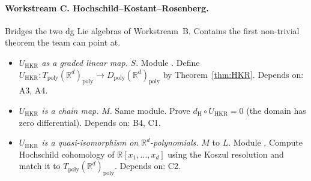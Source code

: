 \documentclass[11pt,a4paper]{article}
\theoremstyle{definition}
\newcommand{\R}{\mathbb{R}}
\newcommand{\Tpoly}{T_{\mathrm{poly}}}
\newcommand{\Dpoly}{D_{\mathrm{poly}}}
\newcommand{\defi}[1]{\emph{#1}}
\begin{document}
\paragraph{Workstream C. Hochschild--Kostant--Rosenberg.}
Bridges the two dg Lie algebras of Workstream~B. Contains the first
non-trivial theorem the team can point at.
\begin{itemize}[leftmargin=2em]
  \item[\textbf{C1}]
    \defi{$U_{\mathrm{HKR}}$ as a graded linear map.} $S$. Module
    . Define
    $U_{\mathrm{HKR}} \colon \Tpoly(\R^{d})_{\mathrm{poly}}
    \to \Dpoly(\R^{d})_{\mathrm{poly}}$ by
    Theorem~\ref{thm:HKR}. Depends on: A3, A4.
  \item[\textbf{C2}]
    \defi{$U_{\mathrm{HKR}}$ is a chain map.} $M$. Same module.
    Prove $d_{\mathrm{H}} \circ U_{\mathrm{HKR}} = 0$ (the domain has
    zero differential). Depends on: B4, C1.
  \item[\textbf{C3}]
    \defi{$U_{\mathrm{HKR}}$ is a quasi-isomorphism on
          $\R^{d}$-polynomials.} $M$ to $L$. Module
    . Compute Hochschild
    cohomology of $\R[x_{1},\dots,x_{d}]$ using the Koszul
    resolution and match it to $\Tpoly(\R^{d})_{\mathrm{poly}}$.
    Depends on: C2.
\end{itemize}
\end{document}
